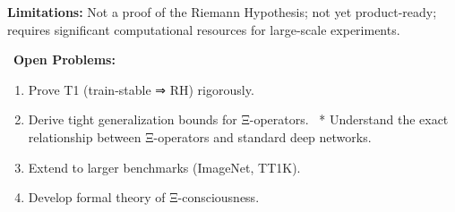 \documentclass[11pt]{article}
\begin{document}
\textbf{Limitations:} Not a proof of the Riemann Hypothesis; not yet product-ready; requires significant computational resources for large-scale experiments.

\textbullet\ \textbf{Open Problems:}
\begin{enumerate}
\item Prove T1 (train-stable ⇒ RH) rigorously.
\item Derive tight generalization bounds for Ξ-operators.
\ * Understand the exact relationship between Ξ-operators and standard deep networks.
\item Extend to larger benchmarks (ImageNet, TT1K).
\item Develop formal theory of Ξ-consciousness.
\end{enumerate}

\end{document}
